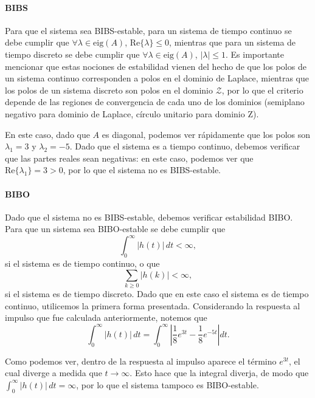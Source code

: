 \documentclass[
  11pt,
  letterpaper,
   addpoints,
   answers
  ]{exam}
\begin{document}
\begin{questions}
\begin{solution}
\paragraph*{BIBS}
Para que el sistema sea BIBS-estable, para un sistema de tiempo continuo se debe cumplir que $\forall \lambda \in \mathrm{eig}(A)$, $\mathrm{Re}\{\lambda\}\le 0$, mientras que para un sistema de tiempo discreto se debe cumplir que $\forall \lambda \in \mathrm{eig}(A)$, $|\lambda|\le 1$. Es importante mencionar que estas nociones de estabilidad vienen del hecho de que los polos de un sistema continuo corresponden a polos en el dominio de Laplace, mientras que los polos de un sistema discreto son polos en el dominio $\mathcal{Z}$, por lo que el criterio depende de las regiones de convergencia de cada uno de los dominios (semiplano negativo para dominio de Laplace, círculo unitario para dominio Z).

En este caso, dado que $A$ es diagonal, podemos ver rápidamente que los polos son $\lambda_1=3$ y $\lambda_2=-5$. Dado que el sistema es a tiempo continuo, debemos verificar que las partes reales sean negativas: en este caso, podemos ver que $\mathrm{Re}\{\lambda_1\}=3>0$, por lo que el sistema no es BIBS-estable.

\paragraph*{BIBO}
Dado que el sistema no es BIBS-estable, debemos verificar estabilidad BIBO. Para que un sistema sea BIBO-estable se debe cumplir que
\setcounter{equation}{62}
\begin{equation}
\int_{0}^{\infty} |h(t)|\,dt < \infty,
\end{equation}
si el sistema es de tiempo continuo, o que
\begin{equation}
\sum_{k\ge 0} |h(k)| < \infty,
\end{equation}
si el sistema es de tiempo discreto. Dado que en este caso el sistema es de tiempo continuo, utilicemos la primera forma presentada. Considerando la respuesta al impulso que fue calculada anteriormente, notemos que
\begin{equation}
\int_{0}^{\infty} |h(t)|\,dt
=\int_{0}^{\infty} \left| \frac{1}{8}e^{3t}-\frac{1}{8}e^{-5t} \right| dt.
\end{equation}

Como podemos ver, dentro de la respuesta al impulso aparece el término $e^{3t}$, el cual diverge a medida que $t\to\infty$. Esto hace que la integral diverja, de modo que $\int_{0}^{\infty} |h(t)|\,dt=\infty$, por lo que el sistema tampoco es BIBO-estable.


\end{solution}
\end{questions}
\end{document}
